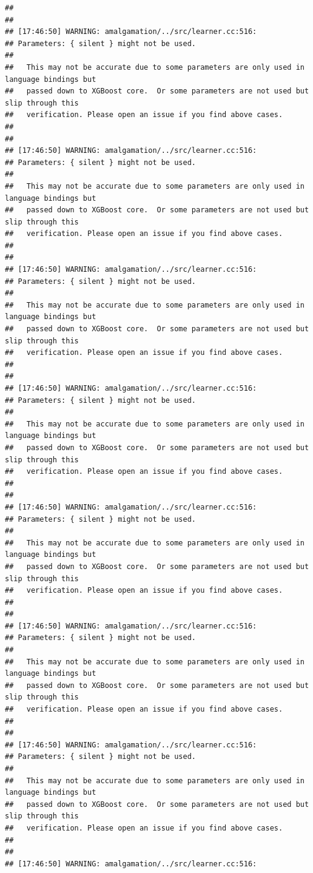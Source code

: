 \documentclass[AMS,STIX2COL]{WileyNJD-v2}\usepackage[]{graphicx}\usepackage[]{color}
\makeatletter
\newenvironment{kframe}{%
 \def\at@end@of@kframe{}%
 \ifinner\ifhmode%
  \def\at@end@of@kframe{\end{minipage}}%
  \begin{minipage}{\columnwidth}%
 \fi\fi%
 \def\FrameCommand##1{\hskip\@totalleftmargin \hskip-\fboxsep
 \colorbox{shadecolor}{##1}\hskip-\fboxsep
     \hskip-\linewidth \hskip-\@totalleftmargin \hskip\columnwidth}%
 \MakeFramed {\advance\hsize-\width
   \@totalleftmargin\z@ \linewidth\hsize
   \@setminipage}}%
 {\par\unskip\endMakeFramed%
 \at@end@of@kframe}
\newenvironment{knitrout}{}{} %
\makeatother
\begin{document}
\begin{knitrout}
\begin{kframe}
\begin{verbatim}
## 
## 
## [17:46:50] WARNING: amalgamation/../src/learner.cc:516: 
## Parameters: { silent } might not be used.
## 
##   This may not be accurate due to some parameters are only used in language bindings but
##   passed down to XGBoost core.  Or some parameters are not used but slip through this
##   verification. Please open an issue if you find above cases.
## 
## 
## [17:46:50] WARNING: amalgamation/../src/learner.cc:516: 
## Parameters: { silent } might not be used.
## 
##   This may not be accurate due to some parameters are only used in language bindings but
##   passed down to XGBoost core.  Or some parameters are not used but slip through this
##   verification. Please open an issue if you find above cases.
## 
## 
## [17:46:50] WARNING: amalgamation/../src/learner.cc:516: 
## Parameters: { silent } might not be used.
## 
##   This may not be accurate due to some parameters are only used in language bindings but
##   passed down to XGBoost core.  Or some parameters are not used but slip through this
##   verification. Please open an issue if you find above cases.
## 
## 
## [17:46:50] WARNING: amalgamation/../src/learner.cc:516: 
## Parameters: { silent } might not be used.
## 
##   This may not be accurate due to some parameters are only used in language bindings but
##   passed down to XGBoost core.  Or some parameters are not used but slip through this
##   verification. Please open an issue if you find above cases.
## 
## 
## [17:46:50] WARNING: amalgamation/../src/learner.cc:516: 
## Parameters: { silent } might not be used.
## 
##   This may not be accurate due to some parameters are only used in language bindings but
##   passed down to XGBoost core.  Or some parameters are not used but slip through this
##   verification. Please open an issue if you find above cases.
## 
## 
## [17:46:50] WARNING: amalgamation/../src/learner.cc:516: 
## Parameters: { silent } might not be used.
## 
##   This may not be accurate due to some parameters are only used in language bindings but
##   passed down to XGBoost core.  Or some parameters are not used but slip through this
##   verification. Please open an issue if you find above cases.
## 
## 
## [17:46:50] WARNING: amalgamation/../src/learner.cc:516: 
## Parameters: { silent } might not be used.
## 
##   This may not be accurate due to some parameters are only used in language bindings but
##   passed down to XGBoost core.  Or some parameters are not used but slip through this
##   verification. Please open an issue if you find above cases.
## 
## 
## [17:46:50] WARNING: amalgamation/../src/learner.cc:516: 

\end{verbatim}
\end{kframe}
\end{knitrout}
\end{document}
